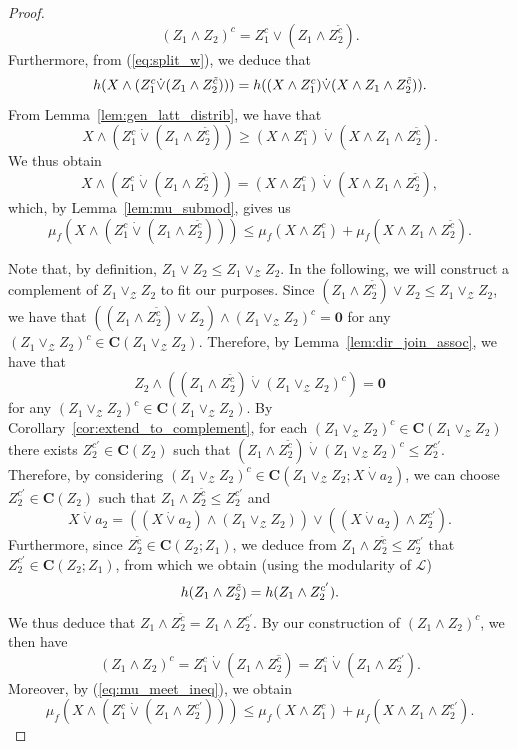 \documentclass[a4paper,11pt,reqno]{article}
\theoremstyle{definition}
\newcommand{\zero}{{\mathbf{0}}}
\begin{document}
\begin{proof}
$$(Z_1\wedge Z_2)^c = Z_1^c\vee(Z_1\wedge Z_2^{\tilde{c}}).$$ 
Furthermore, from (\ref{eq:split_w}), we deduce that
\[
\textup{h}(X \wedge (Z_1^c \dot\vee (Z_1 \wedge Z_2^{\tilde{c}}))) = \textup{h}((X \wedge Z_1^c) \dot\vee (X \wedge Z_1 \wedge Z_2^{\tilde{c}})).
\]
From Lemma~\ref{lem:gen_latt_distrib}, we have that
$$X \wedge (Z_1^c \dot\vee (Z_1 \wedge Z_2^{\tilde{c}})) \geq (X \wedge Z_1^c) \dot\vee (X \wedge Z_1 \wedge Z_2^{\tilde{c}}).$$
We thus obtain
\[
X \wedge (Z_1^c \dot\vee (Z_1 \wedge Z_2^{\tilde{c}})) = (X \wedge Z_1^c) \dot\vee (X \wedge Z_1 \wedge Z_2^{\tilde{c}}),
\]
which, by Lemma~\ref{lem:mu_submod}, gives us
\begin{equation}\label{eq:mu_meet_ineq}
    \mu_f(X \wedge (Z_1^c \dot\vee (Z_1 \wedge Z_2^{\tilde{c}}))) \leq \mu_f(X \wedge Z_1^c) + \mu_f(X \wedge Z_1 \wedge Z_2^{\tilde{c}}).
\end{equation}

Note that, by definition, $Z_1\vee Z_2\leq Z_1\vee_\mathcal{Z}Z_2$. In the following, we will construct a complement of $Z_1\vee_\mathcal{Z}Z_2$ to fit our purposes. 
Since $(Z_1\wedge Z_2^{\tilde{c}})\vee Z_2\leq Z_1\vee_\mathcal{Z}Z_2$, we have that $((Z_1\wedge Z_2^{\tilde{c}})\vee Z_2)\wedge(Z_1\vee_\mathcal{Z}Z_2)^c=\zero$ for any $(Z_1\vee_\mathcal{Z}Z_2)^c\in\mathbf{C}(Z_1\vee_\mathcal{Z}Z_2)$. Therefore, by Lemma~\ref{lem:dir_join_assoc}, we have that 
$$Z_2\wedge ((Z_1\wedge Z_2^{\tilde{c}})\dot\vee(Z_1\vee_\mathcal{Z}Z_2)^c)=\zero$$
for any $(Z_1\vee_\mathcal{Z}Z_2)^c\in\mathbf{C}(Z_1\vee_\mathcal{Z}Z_2)$. By Corollary~\ref{cor:extend_to_complement}, for each $(Z_1\vee_\mathcal{Z}Z_2)^c\in\mathbf{C}(Z_1\vee_\mathcal{Z}Z_2)$ there exists $Z_2^{c'}\in\mathbf{C}(Z_2)$ such that $(Z_1\wedge Z_2^{\tilde{c}})\dot\vee(Z_1\vee_\mathcal{Z}Z_2)^c\leq Z_2^{c'}$. Therefore, by considering $(Z_1\vee_\mathcal{Z}Z_2)^c\in\mathbf{C}(Z_1\vee_\mathcal{Z}Z_2;X\dot\vee a_2)$, we can choose $Z_2^{c'}\in\mathbf{C}(Z_2)$ such that $Z_1\wedge Z_2^{\tilde{c}}\leq Z_2^{c'}$ and 
\begin{equation}
    X\dot\vee a_2=((X\dot\vee a_2)\wedge (Z_1\vee_\mathcal{Z}Z_2))\vee((X\dot\vee a_2)\wedge Z_2^{c'}).
\end{equation}
Furthermore, since $Z_2^{\tilde{c}}\in\mathbf{C}(Z_2;Z_1)$, we deduce from $Z_1\wedge Z_2^{\tilde{c}}\leq Z_2^{c'}$ that $Z_2^{c'}\in\mathbf{C}(Z_2;Z_1)$, from which we obtain (using the modularity of $\mathcal{L}$)
$$\textup{h}(Z_1\wedge Z_2^{\tilde{c}})=\textup{h}(Z_1\wedge Z_2^{c'}).$$
We thus deduce that $Z_1\wedge Z_2^{\tilde{c}}=Z_1\wedge Z_2^{c'}$. By our construction of $(Z_1\wedge Z_2)^c$, we then have
$$(Z_1\wedge Z_2)^c=Z_1^c\dot\vee(Z_1\wedge Z_2^{\hat{c}})=Z_1^c\dot\vee(Z_1\wedge Z_2^{c'}).$$
Moreover, by (\ref{eq:mu_meet_ineq}), we obtain
\begin{equation}\label{eq:mu_z2c'}
    \mu_f(X \wedge (Z_1^c \dot\vee (Z_1 \wedge Z_2^{c'}))) \leq \mu_f(X \wedge Z_1^c) + \mu_f(X \wedge Z_1 \wedge Z_2^{c'}).
\end{equation}


\end{proof}
\end{document}
